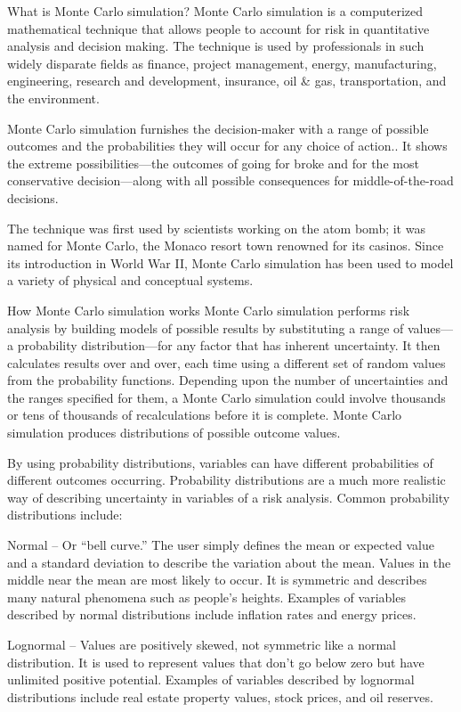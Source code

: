 What is Monte Carlo simulation?
Monte Carlo simulation is a computerized mathematical technique that allows people to account for risk in quantitative analysis and decision making. The technique is used by professionals in such widely disparate fields as finance, project management, energy, manufacturing, engineering, research and development, insurance, oil & gas, transportation, and the environment.

Monte Carlo simulation furnishes the decision-maker with a range of possible outcomes and the probabilities they will occur for any choice of action.. It shows the extreme possibilities—the outcomes of going for broke and for the most conservative decision—along with all possible consequences for middle-of-the-road decisions.

The technique was first used by scientists working on the atom bomb; it was named for Monte Carlo, the Monaco resort town renowned for its casinos. Since its introduction in World War II, Monte Carlo simulation has been used to model a variety of physical and conceptual systems.



How Monte Carlo simulation works
Monte Carlo simulation performs risk analysis by building models of possible results by substituting a range of values—a probability distribution—for any factor that has inherent uncertainty. It then calculates results over and over, each time using a different set of random values from the probability functions. Depending upon the number of uncertainties and the ranges specified for them, a Monte Carlo simulation could involve thousands or tens of thousands of recalculations before it is complete. Monte Carlo simulation produces distributions of possible outcome values.

By using probability distributions, variables can have different probabilities of different outcomes occurring.  Probability distributions are a much more realistic way of describing uncertainty in variables of a risk analysis.  Common probability distributions include:

Normal – Or “bell curve.”  The user simply defines the mean or expected value and a standard deviation to describe the variation about the mean.  Values in the middle near the mean are most likely to occur.  It is symmetric and describes many natural phenomena such as people’s heights.  Examples of variables described by normal distributions include inflation rates and energy prices.

Lognormal – Values are positively skewed, not symmetric like a normal distribution.  It is used to represent values that don’t go below zero but have unlimited positive potential.  Examples of variables described by lognormal distributions include real estate property values, stock prices, and oil reserves.

